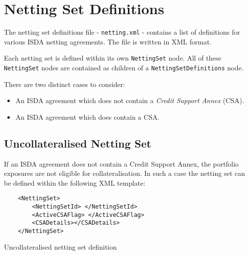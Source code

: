 \section{Netting Set Definitions}\label{sec:nettingsetinput}

The netting set definitions file - {\tt netting.xml} - 
contains a list of
definitions for various ISDA netting agreements. The file is written
in XML format. 

\vspace{1em}

Each netting set is defined within its own \lstinline!NettingSet!
node. All of these \lstinline!NettingSet! nodes are contained as
children of a \lstinline!NettingSetDefinitions! node.

\vspace{1em}

There are two distinct cases to consider:

\begin{itemize}
\item An ISDA agreement which does not contain a \emph{Credit Support
    Annex} (CSA).
\item An ISDA agreement which does contain a CSA.
\end{itemize}
\subsection{Uncollateralised Netting Set}
If an ISDA agreement does not contain a Credit Support Annex, the
portfolio exposures are not eligible for collateralisation. In such a
case the netting set can be defined within the following XML template:

\begin{listing}[H]
\begin{verbatim}
    <NettingSet>
        <NettingSetId> </NettingSetId>
        <ActiveCSAFlag> </ActiveCSAFlag>
        <CSADetails></CSADetails>
    </NettingSet>
\end{verbatim}
\caption{Uncollateralised netting set definition}
\label{lst:nettingSetUncollat}
\end{listing}

